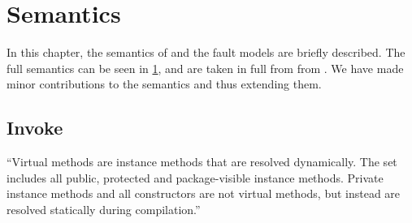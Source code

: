 \chapter{Semantics}\label{chap:semantics}
%
%
%
In this chapter, the semantics of \jcl and the fault models are briefly described. The full semantics can be seen in \cref{chap:semantics}, and are taken in full from from \cite{javasec}. We have made minor contributions to the semantics and thus extending them.



\section{Invoke}
``Virtual methods are instance methods that are resolved dynamically. The set includes all public, protected and package-visible instance methods. Private instance methods and all constructors are not virtual methods, but instead are resolved statically during compilation.'' \cite[cap. 4.3.7.6]{java_card_specc}